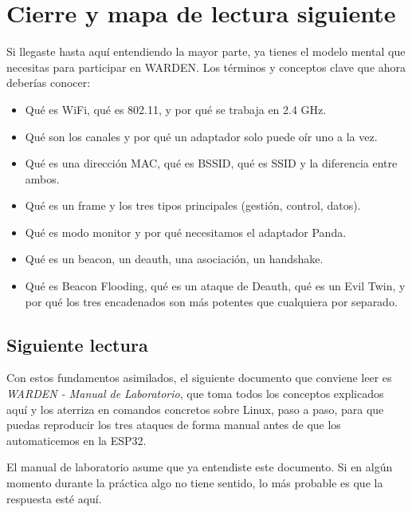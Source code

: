 \documentclass[11pt,a4paper]{article}
\begin{document}
\section{Cierre y mapa de lectura siguiente}

Si llegaste hasta aquí entendiendo la mayor parte, ya tienes el modelo
mental que necesitas para participar en WARDEN. Los términos y conceptos
clave que ahora deberías conocer:

\begin{itemize}
  \item Qué es WiFi, qué es 802.11, y por qué se trabaja en 2.4 GHz.
  \item Qué son los canales y por qué un adaptador solo puede oír uno a
    la vez.
  \item Qué es una dirección MAC, qué es BSSID, qué es SSID y la
    diferencia entre ambos.
  \item Qué es un frame y los tres tipos principales (gestión, control,
    datos).
  \item Qué es modo monitor y por qué necesitamos el adaptador Panda.
  \item Qué es un beacon, un deauth, una asociación, un handshake.
  \item Qué es Beacon Flooding, qué es un ataque de Deauth, qué es un
    Evil Twin, y por qué los tres encadenados son más potentes que
    cualquiera por separado.
\end{itemize}

\subsection{Siguiente lectura}
Con estos fundamentos asimilados, el siguiente documento que conviene leer
es \emph{WARDEN - Manual de Laboratorio}, que toma todos los conceptos
explicados aquí y los aterriza en comandos concretos sobre Linux, paso a
paso, para que puedas reproducir los tres ataques de forma manual antes
de que los automaticemos en la ESP32.

El manual de laboratorio asume que ya entendiste este documento. Si en
algún momento durante la práctica algo no tiene sentido, lo más probable
es que la respuesta esté aquí.
\end{document}
